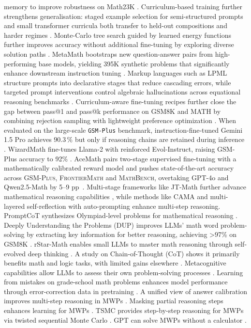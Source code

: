 \documentclass[acmsmall,anonymous]{acmart}
\begin{document}
memory to improve robustness on Math23K \cite{wu-2022-mile}.  Curriculum-based training further strengthens generalisation: staged example selection for semi-structured prompts and small transformer curricula both transfer to held-out compositions and harder regimes \cite{nam-2022-ood-curriculum,nam-2022-ood-transformers}. Monte-Carlo tree search guided by learned energy functions further improves accuracy without additional fine-tuning by exploring diverse solution paths \cite{xu-2023-no-train}.  MetaMath bootstraps new question-answer pairs from high-performing base models, yielding 395K synthetic problems that significantly enhance downstream instruction tuning \cite{yu-2024-metamath}. Markup languages such as LPML structure prompts into declarative stages that reduce cascading errors, while targeted prompt interventions control algebraic hallucinations across equational reasoning benchmarks \cite{yamauchi-2023-lpml,meadows-2025-prompt-interventions}.  Curriculum-aware fine-tuning recipes further close the gap between pass@1 and pass@k performance on GSM8K and MATH by combining rejection sampling with lightweight preference optimization \cite{liu-2023-improving-finetune}.  When evaluated on the large-scale \texttt{GSM-Plus} benchmark, instruction-fine-tuned Gemini 1.5 Pro achieves $90.3\,\%$ but only if reasoning chains are retained during inference \cite{li2024gsmplus}. WizardMath fine-tunes Llama-2 with reinforced Evol-Instruct, raising GSM-Plus accuracy to 92\% \cite{luo2025wizardmath}.  AceMath pairs two-stage supervised fine-tuning with a mathematically
calibrated reward model and pushes state-of-the-art accuracy across
\textsc{GSM-Plus}, \textsc{FrontierMath} and \textsc{MathBench}, overtaking GPT-4o and
Qwen2.5-Math by 5–9 pp~\citep{liu2024acemath}. Multi-stage frameworks like JT-Math further advance mathematical reasoning capabilities \cite{anonymous2025jtmath,anonymous2025jtmath}, while methods like CAMA \cite{anonymous2025cama,anonymous2025cama} and multi-layered self-reflection with auto-prompting \cite{anonymous2025advancingmultistep,anonymous2025advancingmultistep} enhance multi-step reasoning. PromptCoT synthesizes Olympiad-level problems for mathematical reasoning \cite{zhao-etal-2025-promptcot}. Deeply Understanding the Problems (DUP) improves LLMs' math word problem-solving by extracting key information for better reasoning, achieving >97\% on GSM8K \cite{zhong2024achieving}. rStar-Math enables small LLMs to master math reasoning through self-evolved deep thinking \cite{guan2025rstar}. A study on Chain-of-Thought (CoT) shows it primarily benefits math and logic tasks, with limited gains elsewhere \cite{sprague2024a to}. Metacognitive capabilities allow LLMs to assess their own problem-solving processes \cite{didolkar2024metacognitive}. Learning from mistakes on grade-school math problems enhances model performance through error-correction data in pretraining \cite{ye2024physics}. A unified view of answer calibration improves multi-step reasoning in MWPs \cite{deng2023}. Masking partial reasoning steps enhances learning for MWPs \cite{chen2024a}. TSMC provides step-by-step reasoning for MWPs via twisted sequential Monte Carlo \cite{feng2024}. GPT can solve MWPs without a calculator \cite{yang2023b}.
\end{document}
